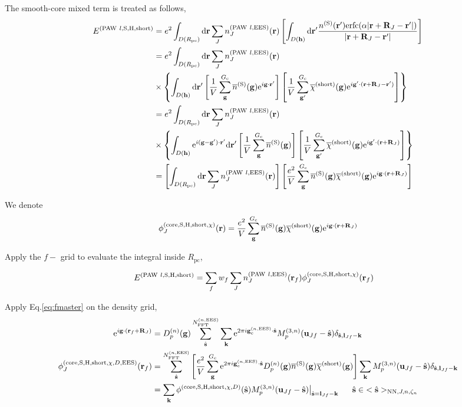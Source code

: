 \documentclass[paper=a4, fontsize=11pt]{article} %
\numberwithin{equation}{section} %
\numberwithin{figure}{section} %
\numberwithin{table}{section} %
\newcommand{\ol}{\overline}
\newcommand{\bh}{{\bf{h}}}
\newcommand{\bu}{{\bf{u}}}
\newcommand{\bl}{{\bf{l}}}
\newcommand{\bk}{{\bf{k}}}
\newcommand{\bs}{{\bf{s}}}
\newcommand{\bg}{{\bf{g}}}
\newcommand{\br}{{\bf{r}}}
\newcommand{\bR}{{\bf{R}}}
\newcommand{\hs}{{\hat{\bf{s}}}}
\newcommand{\rS}{{\mathrm{S}}}
\newcommand{\rEES}{{\mathrm{EES}}}
\newcommand{\rcore}{{\mathrm{core}}}
\newcommand{\rNN}{{\mathrm{NN}}}
\newcommand{\re}{{\mathrm{e}}}
\newcommand{\rshort}{{\mathrm{short}}}
\newcommand{\rerfc}{{\mathrm{erfc}}}
\newcommand{\rP}{{\mathrm{PAW}}}
\newcommand{\rd}{{\mathrm{d}}}
\newcommand{\rH}{{\mathrm{H}}}
\newcommand{\ibgr}{i\bg\cdot\br}
\newcommand{\gcnEES}{{\bg_c^{(n,\rEES)}}}
\newcommand{\NFFTnEES}{{N^{(n,\rEES)}_{\mathrm{FFT}}}}
\newcommand{\Gc}{{G_{\mathrm{c}}}}
\newcommand{\Rpc}{{R_{\mathrm{pc}}}}
\newcommand{\Dng}{{D^{(n)}_p(\bg)}}
\newcommand{\Mn}{{M_p^{(3,n)}}}
\newcommand{\hsJn}{{<\hs>_{\rNN,J,n,\zeta_n}}}
\newcommand{\hsinJn}{{\ \ \ \ \ \hs  \in  \hsJn}}
\begin{document}
The smooth-core mixed term is treated as follows,
\begin{equation}
\begin{split}
E^{(\rP\ l,\rS,\rH,\rshort)}
&= e^2 \int_{D(\Rpc)} \rd\br \sum_J n_J^{(\rP\ l,\rEES)}(\br) \left[\int_{D(\bh)} \rd\br'\frac{n^{(\rS)}(\br')\rerfc(\alpha|\br+\bR_J-\br'|)}{|\br+\bR_J-\br'|}\right] \\
&= e^2 \int_{D(\Rpc)} \rd\br \sum_J n_J^{(\rP\ l,\rEES)}(\br)  \\
&\times \left\{\int_{D(\bh)} \rd\br' \left[\frac{1}{V}\sum_\bg^\Gc \ol n^{(\rS)}(\bg) \re^{\ibgr'}\right] \left[\frac{1}{V}\sum_{\bg'}^\Gc \ol 
\chi^{(\rshort)}(\bg) \re^{i\bg'\cdot(\br+\bR_J-\br')}\right]   \right\} \\
&= e^2 \int_{D(\Rpc)} \rd\br \sum_J n_J^{(\rP\ l,\rEES)}(\br)  \\
&\times \left\{\int_{D(\bh)} \re^{i(\bg-\bg')\cdot\br'} \rd\br' \left[\frac{1}{V}\sum_\bg^\Gc \ol n^{(\rS)}(\bg) \right] \left[\frac{1}{V}\sum_{\bg'}^\Gc \ol 
\chi^{(\rshort)}(\bg) \re^{i\bg'\cdot(\br+\bR_J)}\right]   \right\} \\
&= \left[\int_{D(\Rpc)} \rd\br \sum_J n_J^{(\rP\ l,\rEES)}(\br)\right]\left[\frac{e^2}{V}\sum_\bg^\Gc \ol n^{(\rS)}(\bg)\ol \chi^{(\rshort)}(\bg)\re^{i\bg\cdot(\br+\bR_J)}\right]
\end{split}
\end{equation}

We denote
\begin{equation}
\phi_J^{(\rcore,\rS,\rH,\rshort,\chi)}(\br) = \frac{e^2}{V}\sum_\bg^\Gc \ol n^{(\rS)}(\bg)\ol \chi^{(\rshort)}(\bg)\re^{i\bg\cdot(\br+\bR_J)}
\end{equation}

Apply the $f-$ grid to evaluate the integral inside $\Rpc$,

\begin{equation}
\begin{split}
E^{(\rP\ l,\rS,\rH,\rshort)}
&= \sum_f w_f \sum_J n_J^{(\rP\ l,\rEES)}(\br_f)\phi_J^{(\rcore,\rS,\rH,\rshort,\chi)}(\br_f)
\end{split}
\end{equation}

Apply Eq.\eqref{eq:fmaster} on the density grid,
\begin{equation}
\begin{split}
\re^{i\bg\cdot(\br_f+\bR_J)}
  & = \Dng\sum_{\hat \bs}^\NFFTnEES \sum_{\bk} \re^{2\pi i\gcnEES \cdot \hat\bs} \Mn(\bu_{Jf}-\hat \bs)\delta_{\hat \bs,\bl_{Jf}-\bk} \\
\phi_J^{(\rcore,\rS,\rH,\rshort,\chi,D,\rEES)}(\br_f) &= \sum_{\hat \bs}^\NFFTnEES  \left[\frac{e^2}{V}\sum_\bg^\Gc \re^{2\pi i\gcnEES \cdot \hat\bs}  \Dng \ol n^{(\rS)}(\bg)\ol \chi^{(\rshort)}(\bg) \right]\sum_{\bk} \Mn(\bu_{Jf}-\hat \bs)\delta_{\hat \bs,\bl_{Jf}-\bk} \\
&=\sum_{\bk} \phi^{(\rcore,\rS,\rH,\rshort,\chi,D)}(\hs)\Mn(\bu_{Jf}-\hat \bs)\big|_{\hs=\bl_{Jf}-\bk} \hsinJn\\
\end{split}
\end{equation}
\end{document}
